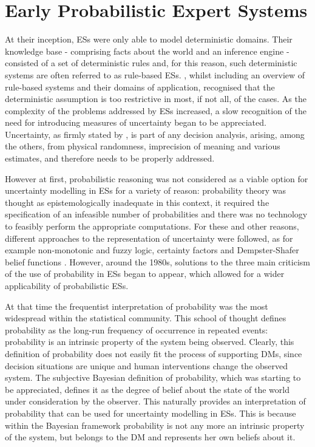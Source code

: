 \section{Early Probabilistic Expert Systems}
\label{sec:early}
At their inception, ESs were only able to model deterministic domains. Their knowledge base - comprising facts about the world and an inference engine  -  consisted of a set of deterministic rules and, for this reason, such deterministic systems are often referred to as rule-based ESs. \citet{Castillo1997b}, whilst including an overview of rule-based systems and their domains of application, recognised that the deterministic assumption is too restrictive in most, if not all, of the cases. As the complexity of the problems addressed by ESs increased, a slow recognition of the need for introducing measures of uncertainty began to be appreciated. Uncertainty, as firmly stated by \citet{French95}, is part of any decision analysis, arising, among the others, from physical randomness, imprecision of meaning and various estimates, and therefore needs to be properly addressed. 

However at first, probabilistic reasoning was not considered as a viable option for uncertainty modelling in ESs for a variety of reason: probability theory was thought as epistemologically inadequate in this context, it required the specification of an infeasible number of probabilities and there was no technology to feasibly perform the appropriate computations. For these and other reasons, different approaches to the representation of uncertainty were followed, as for example non-monotonic and fuzzy logic, certainty factors and Dempster-Shafer belief functions \citep[see e.g.][]{Gabbay1985, Klir1995, Buchanan1984, Shafer1976}. However, around the 1980s, solutions to the three main criticism of the use of probability in ESs began to appear, which allowed for a wider applicability of probabilistic ESs.

At that time the frequentist interpretation of probability was the most widespread within the statistical community. This school of thought defines probability as the long-run frequency of occurrence in repeated events: probability is an intrinsic property of the system being observed.  Clearly, this definition of probability does not easily fit the process of supporting DMs, since decision situations are unique and human interventions change the observed system. The subjective Bayesian definition of probability, which was starting to be appreciated, defines it as the degree of belief about the state of the world under consideration by the observer. This  naturally provides an interpretation of probability that can be used for uncertainty modelling in ESs. This is because within the Bayesian framework probability is not any more an intrinsic property of the system, but belongs to the DM and represents her own beliefs about it. 

